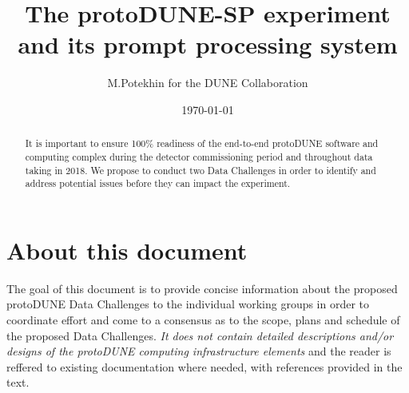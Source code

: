 \documentclass[pdftex,12pt,letter]{article}
\title{The protoDUNE-SP experiment and its prompt processing system}
\date{\today}
\author{M.Potekhin for the DUNE Collaboration}
\newcommand{\pd}{protoDUNE\xspace}
\begin{document}

\maketitle

\begin{abstract}


\noindent It is important to ensure 100\% readiness of the
end-to-end \pd software and computing complex during the detector commissioning period and
throughout data taking in 2018. We propose to conduct two Data Challenges in order to identify
and address potential issues before they can impact the experiment.



\end{abstract}

\tableofcontents

\pagebreak

\section{About this document}

The goal of this document is to provide concise information about the proposed \pd Data Challenges
to the individual working groups in order to coordinate effort and come to a consensus as to the scope,
plans and schedule of the proposed Data Challenges. \textit{It does not contain detailed descriptions
and/or designs of the \pd computing
infrastructure elements} and the reader is reffered to existing documentation where
needed, with references provided in the text.
\end{document}
